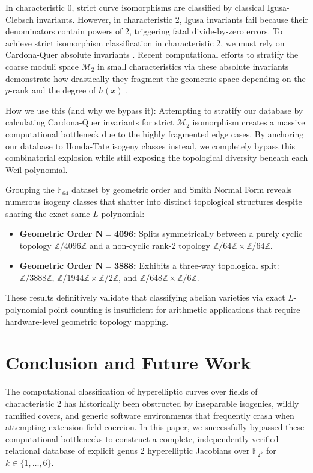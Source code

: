 \documentclass[letterpaper, 11pt]{article}
\begin{document}
In characteristic 0, strict curve isomorphisms are classified by classical Igusa-Clebsch invariants. However, in characteristic 2, Igusa invariants fail because their denominators contain powers of 2, triggering fatal divide-by-zero errors. To achieve strict isomorphism classification in characteristic 2, we must rely on Cardona-Quer absolute invariants \cite{Cardona2005}. Recent computational efforts to stratify the coarse moduli space $\mathcal{M}_2$ in small characteristics via these absolute invariants demonstrate how drastically they fragment the geometric space depending on the $p$-rank and the degree of $h(x)$ \cite{Zobernig2021}.

How we use this (and why we bypass it): Attempting to stratify our database by calculating Cardona-Quer invariants for strict $\mathcal{M}_2$ isomorphism creates a massive computational bottleneck due to the highly fragmented edge cases. By anchoring our database to Honda-Tate isogeny classes instead, we completely bypass this combinatorial explosion while still exposing the topological diversity beneath each Weil polynomial. 

Grouping the $\mathbb{F}_{64}$ dataset by geometric order and Smith Normal Form reveals numerous isogeny classes that shatter into distinct topological structures despite sharing the exact same $L$-polynomial:
\begin{itemize}
    \item \textbf{Geometric Order $\mathbf{N=4096}$:} Splits symmetrically between a purely cyclic topology $\mathbb{Z}/4096\mathbb{Z}$ and a non-cyclic rank-2 topology $\mathbb{Z}/64\mathbb{Z} \times \mathbb{Z}/64\mathbb{Z}$.
    \item \textbf{Geometric Order $\mathbf{N=3888}$:} Exhibits a three-way topological split: $\mathbb{Z}/3888\mathbb{Z}$, $\mathbb{Z}/1944\mathbb{Z} \times \mathbb{Z}/2\mathbb{Z}$, and $\mathbb{Z}/648\mathbb{Z} \times \mathbb{Z}/6\mathbb{Z}$.
\end{itemize}
These results definitively validate that classifying abelian varieties via exact $L$-polynomial point counting is insufficient for arithmetic applications that require hardware-level geometric topology mapping. 

\section{Conclusion and Future Work}
The computational classification of hyperelliptic curves over fields of characteristic 2 has historically been obstructed by inseparable isogenies, wildly ramified covers, and generic software environments that frequently crash when attempting extension-field coercion. In this paper, we successfully bypassed these computational bottlenecks to construct a complete, independently verified relational database of explicit genus 2 hyperelliptic Jacobians over $\mathbb{F}_{2^k}$ for $k \in \{1, \dots, 6\}$. 
\end{document}
